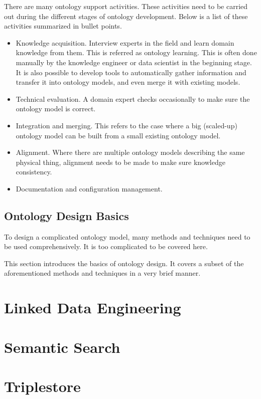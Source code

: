 There are many ontology support activities. These activities need to be carried out during the different stages of ontology development. Below is a list of these activities summarized in bullet points.
\begin{itemize}
	\item Knowledge acquisition. Interview experts in the field and learn domain knowledge from them. This is referred as ontology learning. This is often done manually by the knowledge engineer or data scientist in the beginning stage. It is also possible to develop tools to automatically gather information and transfer it into ontology models, and even merge it with existing models.
	\item Technical evaluation. A domain expert checks occasionally to make sure the ontology model is correct.
	\item Integration and merging. This refers to the case where a big (scaled-up) ontology model can be built from a small existing ontology model.
	\item Alignment. Where there are multiple ontology models describing the same physical thing, alignment needs to be made to make sure knowledge consistency.
	\item Documentation and configuration management.
\end{itemize}

\subsection{Ontology Design Basics}

To design a complicated ontology model, many methods and techniques need to be used comprehensively. It is too complicated to be covered here.

This section introduces the basics of ontology design. It covers a subset of the aforementioned methods and techniques in a very brief manner.



\section{Linked Data Engineering}

\section{Semantic Search}

\section{Triplestore}

